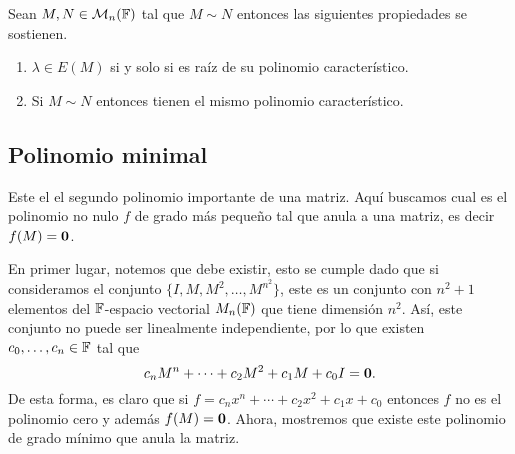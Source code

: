 \begin{teor} \label{teor:PropPCaract}
  Sean $M, N \in \mathcal{M}_n(\mathbb{F})$ tal que $M \sim N$ entonces las siguientes propiedades se sostienen.
  \begin{enumerate}
    \item $\lambda \in E(M)$ si y solo si es raíz de su polinomio característico.
    \item Si $M \sim N$ entonces tienen el mismo polinomio característico.
  \end{enumerate}
\end{teor}



\subsection{Polinomio minimal}

Este el el segundo polinomio importante de una matriz. Aquí buscamos cual es el polinomio no nulo $f$ de grado más pequeño tal que anula a una matriz, es decir $f(M) = \mathbf{0}$.

En primer lugar, notemos que debe existir, esto se cumple dado que si consideramos el conjunto $\{I,M,M^2,\ldots,M^{n^2}\}$, este es un conjunto con $n^2+1$ elementos del $\mathbb{F}$-espacio vectorial $M_n(\mathbb{F})$ que tiene dimensión $n^2$. Así, este conjunto no puede ser linealmente independiente, por lo que existen $c_0,\ldots,c_n\in \mathbb{F}$ tal que 
\[ c_n M^n + \cdots + c_2 M^2 + c_1 M + c_0 I = \mathbf{0}. \]
De esta forma, es claro que si $f = c_n x^n + \cdots + c_2 x^2 + c_1 x + c_0$ entonces $f$ no es el polinomio cero y además $f(M) = \mathbf{0}$. Ahora, mostremos que existe este polinomio de grado mínimo que anula la matriz.


